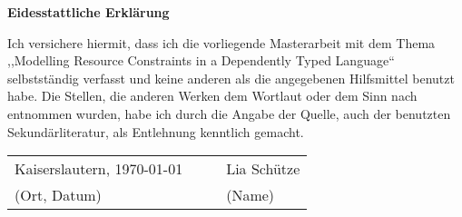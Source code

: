 \newpage
\thispagestyle{empty}
\hspace{0pt}
\vfill
\begin{center}
    \textbf{Eidesstattliche Erklärung}
\end{center}

\noindent Ich versichere hiermit, dass ich die vorliegende Masterarbeit mit dem Thema ,,Modelling Resource Constraints in a Dependently Typed Language`` selbstst{\"a}ndig verfasst und keine anderen als die angegebenen Hilfsmittel benutzt habe. Die Stellen, die anderen Werken dem Wortlaut oder dem Sinn nach entnommen wurden, habe ich durch die Angabe der Quelle, auch der benutzten Sekund{\"a}rliteratur, als Entlehnung kenntlich gemacht.

\vspace{3cm}
\noindent
\begin{tabular}{p{}cp{}}
    Kaiserslautern, \today & & Lia Schütze \\ \cline{1-1} \cline{3-3}
    (Ort, Datum) & ~~ & (Name)
\end{tabular}
\vfill
\hspace{0pt}
